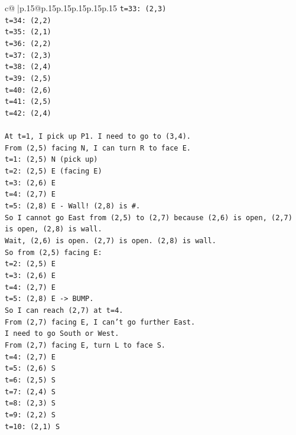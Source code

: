 \documentclass{article}
\begin{document}
{\begin{supertabular}{c@{$\;$}|p{.15\linewidth}@{}p{.15\linewidth}p{.15\linewidth}p{.15\linewidth}p{.15\linewidth}p{.15\linewidth}}
{{{\texttt{t=33: (2,3)} \\
\texttt{t=34: (2,2)} \\
\texttt{t=35: (2,1)} \\
\texttt{t=36: (2,2)} \\
\texttt{t=37: (2,3)} \\
\texttt{t=38: (2,4)} \\
\texttt{t=39: (2,5)} \\
\texttt{t=40: (2,6)} \\
\texttt{t=41: (2,5)} \\
\texttt{t=42: (2,4)} \\
\\ 
\texttt{At t=1, I pick up P1. I need to go to (3,4).} \\
\texttt{From (2,5) facing N, I can turn R to face E.} \\
\texttt{t=1: (2,5) N (pick up)} \\
\texttt{t=2: (2,5) E (facing E)} \\
\texttt{t=3: (2,6) E} \\
\texttt{t=4: (2,7) E} \\
\texttt{t=5: (2,8) E {-} Wall! (2,8) is \#.} \\
\texttt{So I cannot go East from (2,5) to (2,7) because (2,6) is open, (2,7) is open, (2,8) is wall.} \\
\texttt{Wait, (2,6) is open. (2,7) is open. (2,8) is wall.} \\
\texttt{So from (2,5) facing E:} \\
\texttt{t=2: (2,5) E} \\
\texttt{t=3: (2,6) E} \\
\texttt{t=4: (2,7) E} \\
\texttt{t=5: (2,8) E {-}> BUMP.} \\
\texttt{So I can reach (2,7) at t=4.} \\
\texttt{From (2,7) facing E, I can't go further East.} \\
\texttt{I need to go South or West.} \\
\texttt{From (2,7) facing E, turn L to face S.} \\
\texttt{t=4: (2,7) E} \\
\texttt{t=5: (2,6) S} \\
\texttt{t=6: (2,5) S} \\
\texttt{t=7: (2,4) S} \\
\texttt{t=8: (2,3) S} \\
\texttt{t=9: (2,2) S} \\
\texttt{t=10: (2,1) S} \\
}}}
\end{supertabular}}
\end{document}
